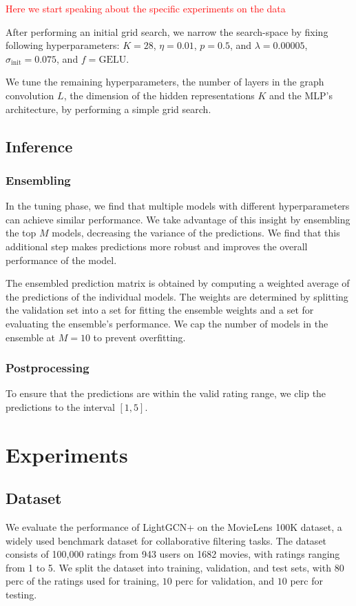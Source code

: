 \documentclass[10pt,conference,compsocconf]{IEEEtran}
\begin{document}
\textcolor{red}{Here we start speaking about the specific experiments on the data}

After performing an initial grid search, we narrow the search-space by fixing following hyperparameters: $K=28$, $\eta=0.01$, $p=0.5$, and $\lambda=0.00005$, $\sigma_{\text{init}}=0.075$, and $f=\text{GELU}$.

We tune the remaining hyperparameters, the number of layers in the graph convolution $L$, the dimension of the hidden representations $K$ and the MLP's architecture, by performing a simple grid search.

\subsection{Inference}
\subsubsection{Ensembling}
In the tuning phase, we find that multiple models with different hyperparameters can achieve similar performance.
We take advantage of this insight by ensembling the top $M$ models, decreasing the variance of the predictions.
We find that this additional step makes predictions more robust and improves the overall performance of the model.

The ensembled prediction matrix is obtained by computing a weighted average of the predictions of the individual models.
The weights are determined by splitting the validation set into a set for fitting the ensemble weights and a set for evaluating the ensemble's performance.
We cap the number of models in the ensemble at $M=10$ to prevent overfitting.
\subsubsection{Postprocessing}
To ensure that the predictions are within the valid rating range, we clip the predictions to the interval $[1, 5]$.


\section{Experiments}
\subsection{Dataset}
We evaluate the performance of LightGCN+ on the MovieLens 100K dataset, a widely used benchmark dataset for collaborative filtering tasks.
The dataset consists of 100,000 ratings from 943 users on 1682 movies, with ratings ranging from 1 to 5.
We split the dataset into training, validation, and test sets, with $80$ perc of the ratings used for training, $10$ perc for validation, and $10$ perc for testing.
\end{document}
